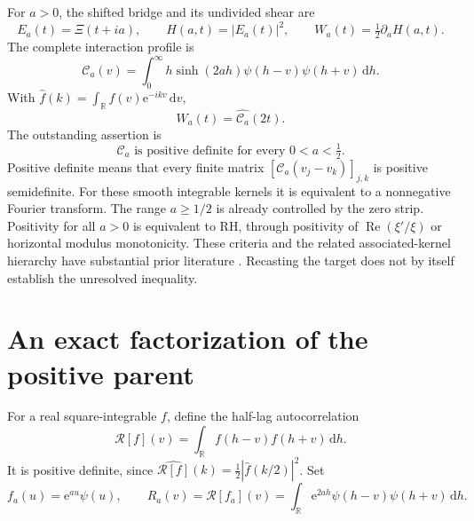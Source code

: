 \documentclass[11pt,letterpaper]{article}
\numberwithin{equation}{section}
\theoremstyle{remark}\newtheorem{remark}[proposition]{Remark}
\newcommand{\R}{\mathbb R}
\newcommand{\dd}{\,\mathrm d}
\newcommand{\calC}{\mathcal C}
\newcommand{\Repart}{\operatorname{Re}}
\newcommand{\ee}{\mathrm e}
\begin{document}
For $a>0$, the shifted bridge and its undivided shear are
\begin{equation}
 E_a(t)=\Xi(t+ia),\qquad
 H(a,t)=|E_a(t)|^2,\qquad W_a(t)=\tfrac12\partial_aH(a,t).
\end{equation}
The complete interaction profile is
\begin{equation}\label{eq:C}
 \calC_a(v)=\int_0^\infty h\sinh(2ah)
            \psi(h-v)\psi(h+v)\dd h.
\end{equation}
With $\widehat f(k)=\int_{\R}f(v)\ee^{-ikv}\dd v$,
\begin{equation}\label{eq:target}
 W_a(t)=\widehat{\calC_a}(2t).
\end{equation}
The outstanding assertion is
\begin{equation}\label{eq:open}
 \boxed{\calC_a\text{ is positive definite for every }0<a<\tfrac12.}
\end{equation}
Positive definite means that every finite matrix
$[\calC_a(v_j-v_k)]_{j,k}$ is positive semidefinite. For these smooth integrable kernels it is equivalent to a nonnegative Fourier transform. The range $a\ge1/2$ is already controlled by the zero strip. Positivity for all $a>0$ is equivalent to RH, through positivity of $\Repart(\xi'/\xi)$ or horizontal modulus monotonicity. These criteria and the related associated-kernel hierarchy have substantial prior literature \cite{lagarias,lagariasCorrection,csordas,cv}. Recasting the target does not by itself establish the unresolved inequality.

\section{An exact factorization of the positive parent}
For a real square-integrable $f$, define the half-lag autocorrelation
\[
 \mathscr R[f](v)=\int_{\R}f(h-v)f(h+v)\dd h.
\]
It is positive definite, since
$\widehat{\mathscr R[f]}(k)=\tfrac12|\widehat f(k/2)|^2$.
Set
\begin{equation}
 f_a(u)=\ee^{au}\psi(u),\qquad
 R_a(v)=\mathscr R[f_a](v)
       =\int_{\R}\ee^{2ah}\psi(h-v)\psi(h+v)\dd h.
\end{equation}
\end{document}
